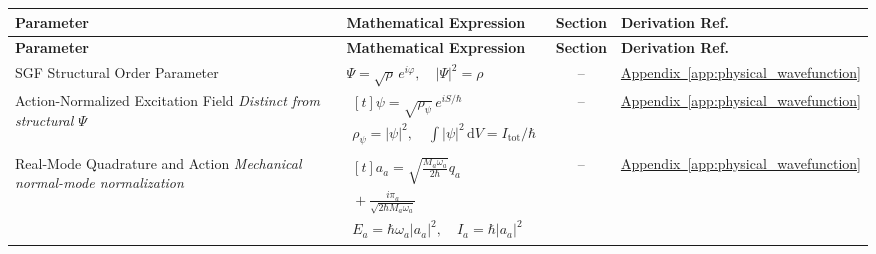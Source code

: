 \vspace{0.5cm}
\noindent
\begin{longtable}{@{} p{4.5cm} p{6cm} c p{4cm} @{}}
\toprule
\textbf{Parameter} & \textbf{Mathematical Expression} & \textbf{Section} & \textbf{Derivation Ref.} \\
\midrule
\endfirsthead
\toprule
\textbf{Parameter} & \textbf{Mathematical Expression} & \textbf{Section} & \textbf{Derivation Ref.} \\
\midrule
\endhead

{\raggedright SGF Structural Order Parameter\par} & {\raggedright $\Psi=\sqrt\rho\,e^{i\varphi},\quad |\Psi|^2=\rho$\par} & -- & {\raggedright \hyperref[app:physical_wavefunction]{Appendix~\ref*{app:physical_wavefunction}}\par} \\

{\raggedright Action-Normalized Excitation Field \newline \textit{Distinct from structural $\Psi$}\par} & {\raggedright $\begin{gathered}[t]\psi=\sqrt{\rho_\psi}\,e^{iS/\hbar} \\ \rho_\psi=|\psi|^2,\quad\int|\psi|^2\,\mathrm dV=I_{\mathrm{tot}}/\hbar\end{gathered}$\par} & -- & {\raggedright \hyperref[app:physical_wavefunction]{Appendix~\ref*{app:physical_wavefunction}}\par} \\

{\raggedright Real-Mode Quadrature and Action \newline \textit{Mechanical normal-mode normalization}\par} & {\raggedright $\begin{gathered}[t]a_a=\sqrt{\frac{M_a\omega_a}{2\hbar}}q_a \\ {}+\frac{i\pi_a}{\sqrt{2\hbar M_a\omega_a}} \\ E_a=\hbar\omega_a|a_a|^2,\quad I_a=\hbar|a_a|^2\end{gathered}$\par} & -- & {\raggedright \hyperref[app:physical_wavefunction]{Appendix~\ref*{app:physical_wavefunction}}\par} \\


\end{longtable}
